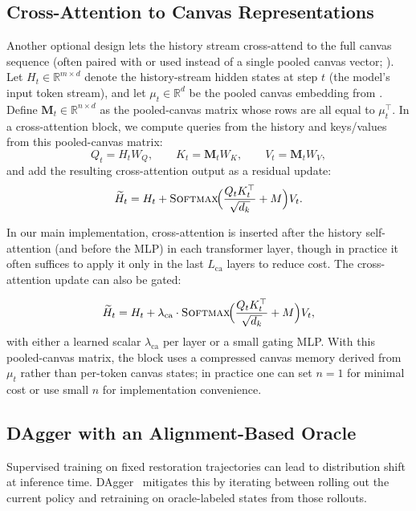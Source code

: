 \documentclass[11pt]{article}
\begin{document}
\subsection{Cross-Attention to Canvas Representations}
\label{sec:canvas_cross_attention}

Another optional design lets the history stream cross-attend to the full canvas sequence (often paired with or used instead of a single pooled canvas vector; ). Let $H_t \in \mathbb{R}^{m\times d}$ denote the history-stream hidden states at step $t$ (the model's input token stream), and let $\mu_t\in\mathbb{R}^d$ be the pooled canvas embedding from . Define $\mathbf{M}_t \in \mathbb{R}^{n\times d}$ as the pooled-canvas matrix whose rows are all equal to $\mu_t^\top$. In a cross-attention block, we compute queries from the history and keys/values from this pooled-canvas matrix:
\[
Q_t = H_t W_Q,\qquad K_t = \mathbf{M}_t W_K,\qquad V_t = \mathbf{M}_t W_V,
\]
and add the resulting cross-attention output as a residual update:
\[
\widetilde{H}_t
= H_t + \textsc{Softmax}\!\Big(\frac{Q_tK_t^\top}{\sqrt{d_k}} + M\Big)V_t.
\]


In our main implementation, cross-attention is inserted after the history self-attention (and before the MLP) in each transformer layer, though in practice it often suffices to apply it only in the last $L_{\text{ca}}$ layers to reduce cost. The cross-attention update can also be gated:

\[
\widetilde{H}_t = H_t + \lambda_{\text{ca}}\cdot \textsc{Softmax}\!\Big(\frac{Q_tK_t^\top}{\sqrt{d_k}} + M\Big)V_t,
\]
with either a learned scalar $\lambda_{\text{ca}}$ per layer or a small gating MLP.
With this pooled-canvas matrix, the block uses a compressed canvas memory derived from $\mu_t$ rather than per-token canvas states; in practice one can set $n=1$ for minimal cost or use small $n$ for implementation convenience.

\subsection{DAgger with an Alignment-Based Oracle}
\label{sec:dagger}

Supervised training on fixed restoration trajectories can lead to distribution shift at inference time. DAgger~\citep{ross2011dagger} mitigates this by iterating between rolling out the current policy and retraining on oracle-labeled states from those rollouts.
\end{document}
